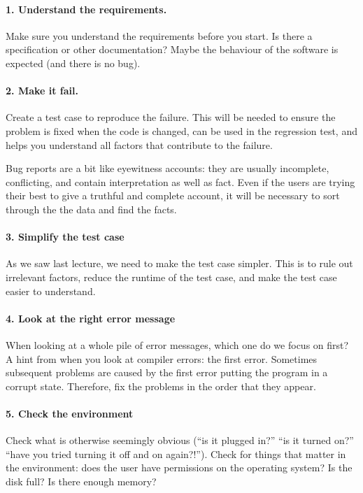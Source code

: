 \paragraph{1. Understand the requirements.} 
Make sure you understand the requirements before you start. Is there a specification or other documentation? Maybe the behaviour of the software is expected (and there is no bug). 

\paragraph{2. Make it fail.} 
Create a test case to reproduce the failure. This will be needed to ensure the problem is fixed when the code is changed, can be used in the regression test, and helps you understand all factors that contribute to the failure. 

Bug reports are a bit like eyewitness accounts: they are usually incomplete, conflicting, and contain interpretation as well as fact. Even if the users are trying their best to give a truthful and complete account, it will be necessary to sort through the the data and find the facts.

\paragraph{3. Simplify the test case} 
As we saw last lecture, we need to make the test case simpler. This is to rule out irrelevant factors, reduce the runtime of the test case, and make the test case easier to understand.

\paragraph{4. Look at the right error message}
When looking at a whole pile of error messages, which one do we focus on first? A hint from when you look at compiler errors: the first error. Sometimes subsequent problems are caused by the first error putting the program in a corrupt state. Therefore, fix the problems in the order that they appear.

\paragraph{5. Check the environment}
Check what is otherwise seemingly obvious (``is it plugged in?'' ``is it turned on?'' ``have you tried turning it off and on again?!''). Check for things that matter in the environment: does the user have permissions on the operating system? Is the disk full? Is there enough memory?

